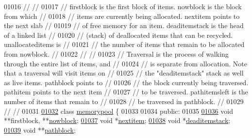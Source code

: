 \begin{DoxyCode}
01016 \textcolor{comment}{//                                                                           //}
01017 \textcolor{comment}{// firstblock is the first block of items. nowblock is the block from which  //}
01018 \textcolor{comment}{//   items are currently being allocated. nextitem points to the next slab   //}
01019 \textcolor{comment}{//   of free memory for an item. deaditemstack is the head of a linked list  //}
01020 \textcolor{comment}{//   (stack) of deallocated items that can be recycled.  unallocateditems is //}
01021 \textcolor{comment}{//   the number of items that remain to be allocated from nowblock.          //}
01022 \textcolor{comment}{//                                                                           //}
01023 \textcolor{comment}{// Traversal is the process of walking through the entire list of items, and //}
01024 \textcolor{comment}{//   is separate from allocation.  Note that a traversal will visit items on //}
01025 \textcolor{comment}{//   the "deaditemstack" stack as well as live items.  pathblock points to   //}
01026 \textcolor{comment}{//   the block currently being traversed.  pathitem points to the next item  //}
01027 \textcolor{comment}{//   to be traversed.  pathitemsleft is the number of items that remain to   //}
01028 \textcolor{comment}{//   be traversed in pathblock.                                              //}
01029 \textcolor{comment}{//                                                                           //}
01031 \textcolor{comment}{}
\hypertarget{tetgen_8h_source.tex_l01032}{}\hyperlink{classtetgenmesh_1_1memorypool}{01032}   \textcolor{keyword}{class }\hyperlink{classtetgenmesh_1_1memorypool}{memorypool} \{
01033 
01034   \textcolor{keyword}{public}:
01035 
\hypertarget{tetgen_8h_source.tex_l01036}{}\hyperlink{classtetgenmesh_1_1memorypool_a63e80bcff81323ea491bfa189c15879b}{01036}     \textcolor{keywordtype}{void} **firstblock, **\hyperlink{classtetgenmesh_1_1memorypool_a63e80bcff81323ea491bfa189c15879b}{nowblock};
\hypertarget{tetgen_8h_source.tex_l01037}{}\hyperlink{classtetgenmesh_1_1memorypool_ab0864200773e9371db60d190fb0c3cf7}{01037}     \textcolor{keywordtype}{void} *\hyperlink{classtetgenmesh_1_1memorypool_ab0864200773e9371db60d190fb0c3cf7}{nextitem};
\hypertarget{tetgen_8h_source.tex_l01038}{}\hyperlink{classtetgenmesh_1_1memorypool_a5979100eaabf64ef2179a259e3adf0b7}{01038}     \textcolor{keywordtype}{void} *\hyperlink{classtetgenmesh_1_1memorypool_a5979100eaabf64ef2179a259e3adf0b7}{deaditemstack};
\hypertarget{tetgen_8h_source.tex_l01039}{}\hyperlink{classtetgenmesh_1_1memorypool_a6830e3c672f7a7546c2ea0ed70b2ac38}{01039}     \textcolor{keywordtype}{void} **\hyperlink{classtetgenmesh_1_1memorypool_a6830e3c672f7a7546c2ea0ed70b2ac38}{pathblock};

\end{DoxyCode}
